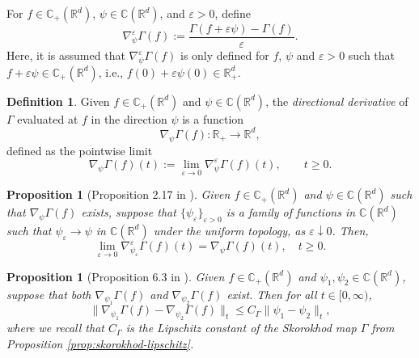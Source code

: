 \documentclass[11pt]{article}
\theoremstyle{definition}
\newtheorem{definition}[assumption]{Definition}
\theoremstyle{plain}
\newtheorem{proposition}[assumption]{Proposition}
\newcommand{\R}{\mathbb{R}}
\newcommand{\C}{\mathbb{C}}
\newcommand{\veps}{\varepsilon}
\begin{document}
For \( f \in \C_+(\R^d) \), \( \psi \in \C(\R^d) \), and \( \varepsilon > 0 \), define
\begin{equation}\label{eq:eps-dir-deriv}
\nabla_\psi^\varepsilon \Gamma(f) := \frac{\Gamma(f + \varepsilon \psi) - \Gamma(f)}{\varepsilon}.
\end{equation}
Here, it is assumed that $\nabla_\psi^\varepsilon \Gamma(f)$ is only defined for $f$, $\psi$ and \( \varepsilon > 0 \) such that  
\( f + \varepsilon \psi \in \C_+(\R^d) \), i.e., \( f(0) + \varepsilon \psi(0) \in \mathbb{R}_+^d \).

\begin{definition}
Given \( f \in \C_+(\R^d) \) and \( \psi \in \C(\R^d) \),  
the {\em directional derivative} of \( \Gamma \) evaluated at \( f \) in the direction \( \psi \) is a function
\[
\nabla_\psi \Gamma(f): \mathbb{R}_+ \to \mathbb{R}^d,
\]
defined as the pointwise limit
\[
\nabla_\psi \Gamma(f)(t) := \lim_{\varepsilon \to 0} \nabla_\psi^\varepsilon \Gamma(f)(t), \qquad t \geq 0.
\]
\end{definition}

\begin{proposition}[Proposition 2.17 in \cite{LipshutzRamanan2018}]\label{prop:nabla-veps}
Given \( f \in \C_+(\R^d) \) and \( \psi \in \C(\R^d) \) such that  
\( \nabla_\psi \Gamma(f) \) exists, suppose that \(\{\psi_\varepsilon\}_{\varepsilon > 0}\) is a family of functions in \( \C(\R^d) \) such that 
$\psi_\varepsilon \to \psi$ in \( \C(\R^d) \) under the uniform topology, as $\veps \downarrow 0$. Then, 
\begin{equation}
\lim_{\varepsilon \to 0} \nabla^\veps_{\psi_\varepsilon} \Gamma(f)(t) = \nabla_\psi \Gamma(f)(t), \quad t \geq 0. 
\end{equation}
\end{proposition}

\begin{proposition}[Proposition 6.3 in \cite{LipshutzRamanan2018}]\label{prop:nabla-lipschitz}
Given \( f \in \C_+(\R^d) \) and \( \psi_1, \psi_2 \in \C(\R^d) \),  
suppose that both \( \nabla_{\psi_1} \Gamma(f) \) and \( \nabla_{\psi_2} \Gamma(f) \) exist.  
Then for all \( t \in [0,\infty) \),
\begin{equation}
\| \nabla_{\psi_1} \Gamma(f) - \nabla_{\psi_2} \Gamma(f) \|_t \le C_\Gamma \| \psi_1 - \psi_2 \|_t,
\end{equation}
where we recall that $C_\Gamma$ is the Lipschitz constant of the Skorokhod map $\Gamma$ 
from Proposition \ref{prop:skorokhod-lipschitz}.
\end{proposition}
\end{document}
